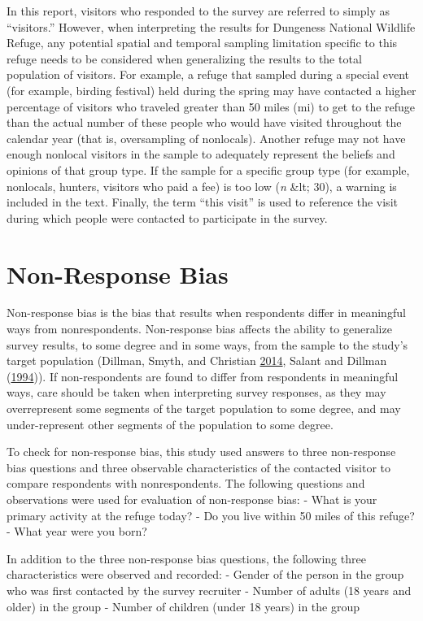 \documentclass[]{book}
\begin{document}
In this report, visitors who responded to the survey are referred to
simply as ``visitors.'' However, when interpreting the results for
Dungeness National Wildlife Refuge, any potential spatial and temporal
sampling limitation specific to this refuge needs to be considered when
generalizing the results to the total population of visitors. For
example, a refuge that sampled during a special event (for example,
birding festival) held during the spring may have contacted a higher
percentage of visitors who traveled greater than 50 miles (mi) to get to
the refuge than the actual number of these people who would have visited
throughout the calendar year (that is, oversampling of nonlocals).
Another refuge may not have enough nonlocal visitors in the sample to
adequately represent the beliefs and opinions of that group type. If the
sample for a specific group type (for example, nonlocals, hunters,
visitors who paid a fee) is too low (\emph{n} \&lt; 30), a warning is
included in the text. Finally, the term ``this visit'' is used to
reference the visit during which people were contacted to participate in
the survey.

\section{Non-Response Bias}\label{non-response-bias}

Non-response bias is the bias that results when respondents differ in
meaningful ways from nonrespondents. Non-response bias affects the
ability to generalize survey results, to some degree and in some ways,
from the sample to the study's target population (Dillman, Smyth, and
Christian \protect\hyperlink{ref-dillman2014}{2014}, Salant and Dillman
(\protect\hyperlink{ref-salant1994}{1994})). If non-respondents are
found to differ from respondents in meaningful ways, care should be
taken when interpreting survey responses, as they may overrepresent some
segments of the target population to some degree, and may
under-represent other segments of the population to some degree.

To check for non-response bias, this study used answers to three
non-response bias questions and three observable characteristics of the
contacted visitor to compare respondents with nonrespondents. The
following questions and observations were used for evaluation of
non-response bias: - What is your primary activity at the refuge today?
- Do you live within 50 miles of this refuge? - What year were you born?

In addition to the three non-response bias questions, the following
three characteristics were observed and recorded: - Gender of the person
in the group who was first contacted by the survey recruiter - Number of
adults (18 years and older) in the group - Number of children (under 18
years) in the group
\end{document}
